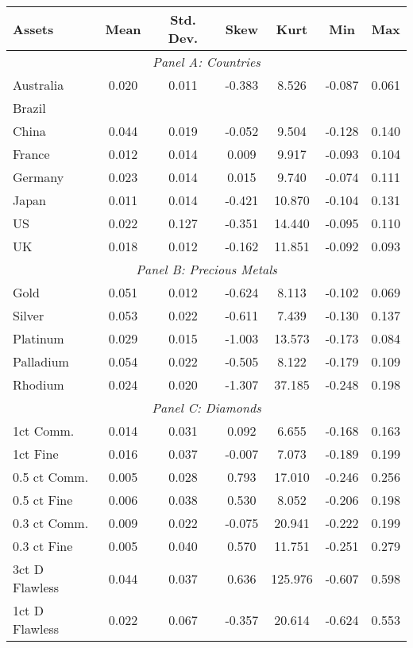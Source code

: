 \begin{tabularx}{1\textwidth}{@{}Xcccccc}
\toprule
Assets & Mean & Std. Dev. & Skew & Kurt & Min & Max \\
\midrule
\multicolumn{7}{c}{\emph{Panel A: Countries}}\\
\addlinespace
Australia 	   &  0.020  & 0.011  &  -0.383 &  8.526  & -0.087  & 0.061    \\
Brazil  	   &   &   &    &  &   &    \\
China  	       &  0.044  & 0.019   &  -0.052 &  9.504  & -0.128  & 0.140    \\
France  	   &  0.012  & 0.014   &  0.009  &  9.917  & -0.093  & 0.104   \\
Germany 	   & 0.023   & 0.014  & 0.015  & 9.740  & -0.074  & 0.111   \\
Japan 	       & 0.011  & 0.014   & -0.421   & 10.870  & -0.104   & 0.131    \\
US			   & 0.022  & 0.127  & -0.351   & 14.440  & -0.095  & 0.110    \\
UK			   & 0.018  & 0.012  & -0.162  & 11.851  & -0.092  & 0.093   \\
\midrule
\multicolumn{7}{c}{\emph{Panel B: Precious Metals}}\\
\addlinespace
Gold		   &  0.051 & 0.012  &  -0.624  &  8.113  & -0.102  & 0.069   \\
Silver		   &  0.053 & 0.022  &  -0.611 &  7.439 & -0.130 & 0.137 \\
Platinum	   &  0.029 & 0.015 &  -1.003 &  13.573 & -0.173  & 0.084 \\
Palladium	   &  0.054 & 0.022 &  -0.505 &  8.122 & -0.179 & 0.109 \\
Rhodium		   &  0.024 & 0.020 &  -1.307 &  37.185 & -0.248 & 0.198 \\
\midrule
\multicolumn{7}{c}{\emph{Panel C: Diamonds}}\\
\addlinespace
1ct Comm.	   &  0.014  & 0.031  &  0.092  &  6.655 & -0.168  & 0.163    \\
1ct Fine	   &  0.016  & 0.037  &  -0.007 &  7.073 & -0.189  & 0.199   \\
0.5 ct Comm.   &  0.005  & 0.028  &  0.793 &  17.010 & -0.246  & 0.256  \\
0.5 ct Fine    &  0.006  & 0.038  &  0.530 &  8.052 & -0.206  & 0.198  \\
0.3 ct Comm.   &  0.009  & 0.022  &  -0.075  &  20.941  & -0.222  & 0.199  \\
0.3 ct Fine	   &  0.005  & 0.040  &  0.570  &  11.751  & -0.251  & 0.279    \\
3ct D Flawless &  0.044  & 0.037  &  0.636  &  125.976  & -0.607  & 0.598  \\
1ct D Flawless &  0.022  & 0.067  &  -0.357 &  20.614  & -0.624  & 0.553   \\
\bottomrule
\end{tabularx}
